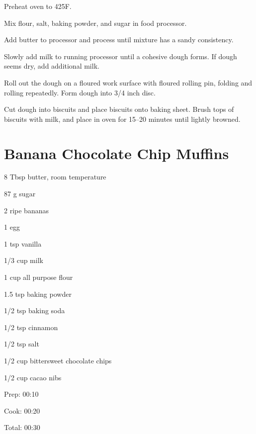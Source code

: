 \documentclass[oneside]{book}  %
\def\thisrecipe{}  %
\newcommand{\recipe}[1]{\section{#1}\def\thisrecipe{: #1}} %
\newcommand{\degF}{\textdegree F\xspace}
\begin{document}
\begin{directions}
  \item Preheat oven to 425\degF.

  \item Mix flour, salt, baking powder, and sugar in food processor.

  \item Add butter to processor and process until mixture has a sandy
  consistency.

  \item Slowly add milk to running processor until a cohesive dough forms. If
  dough seems dry, add additional milk.

  \item Roll out the dough on a floured work surface with floured rolling pin,
  folding and rolling repeatedly. Form dough into 3/4 inch disc.

  \item Cut dough into biscuits and place biscuits onto baking sheet. Brush tops
  of biscuits with milk, and place in oven for 15--20 minutes until lightly
  browned.
\end{directions}
\recipe{Banana Chocolate Chip Muffins} \label{recipe:banana_chocolate_chip_muffins} %

\begin{IT}
  \begin{ingredients}
    \item[8 Tbsp] butter, room temperature
    \item[87 g] sugar
    \item[2] ripe bananas
    \item[1] egg
    \item[1 tsp] vanilla
    \item[1/3 cup] milk
    \item[1 cup] all purpose flour
    \item[1.5 tsp] baking powder
    \item[1/2 tsp] baking soda
    \item[1/2 tsp] cinnamon
    \item[1/2 tsp] salt
    \item[1/2 cup] bittersweet chocolate chips
    \item[1/2 cup] cacao nibs
  \end{ingredients}

  \switchcolumn

  \begin{timeline}
    \item[Prep:]  00:10
    \item[Cook:]  00:20
    \item[Total:] 00:30
  \end{timeline}
\end{IT}
\end{document}
